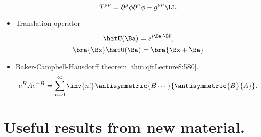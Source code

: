\begin{itemize}
\begin{dmath}\label{eqn:usefulFormulas:500}
T^{\mu\nu} = \partial^\mu \phi \partial^\nu \phi - g^{\mu\nu} \LL.
\end{dmath}
\item Translation operator
\begin{dmath}\label{eqn:usefulFormulas:520}
\hatU(\Ba) = e^{i \Ba \cdot \hat{\BP}},
\end{dmath}
\begin{dmath}\label{eqn:usefulFormulas:540}
\bra{\Bx} \hatU(\Ba) = \bra{\Bx + \Ba}
\end{dmath}
\item Baker-Campbell-Hausdorff theorem \cref{thm:qftLecture8:580}.
\begin{dmath}\label{eqn:usefulFormulas:560}
e^{B} A e^{-B} = \sum_{n = 0}^\infty \inv{n!} \antisymmetric{B \cdots}{\antisymmetric{B}{A}}.
\end{dmath}
\end{itemize}

\section{Useful results from new material.}

